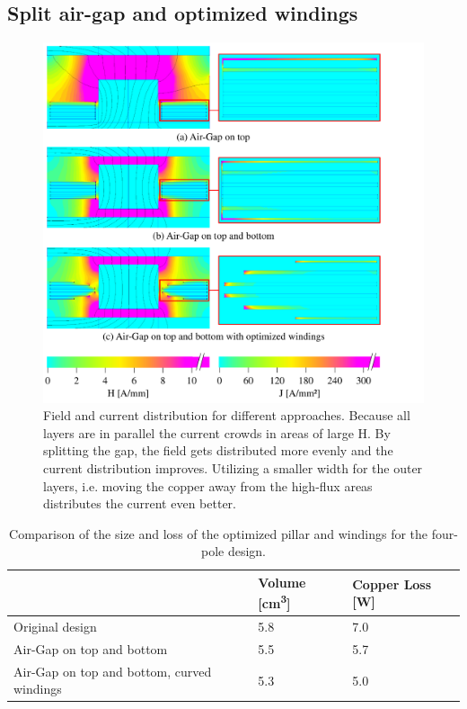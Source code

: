 \documentclass{IPEC2026}
\begin{document}
\subsection{Split air-gap and optimized windings}
\begin{figure}
  \includegraphics[page=1, trim = 0cm 0cm 3cm 0cm, clip, width=\columnwidth]{figures/IPEC_Figure_AirGap.pdf}
  \caption{Field and current distribution for different approaches. Because all layers are in parallel the current crowds in areas of large H. By splitting the gap, the field gets distributed more evenly and the current distribution improves. Utilizing a smaller width for the outer layers, i.e. moving the copper away from the high-flux areas distributes the current even better.}
  \label{fig:OptimizedGap}
\end{figure}

\begin{table}
  \centering
  \caption{Comparison of the size and loss of the optimized pillar and windings for the four-pole design.}
    \begin{tabular}{|p{}|p{}|p{}|}
    \hline  
      & {Volume [\unit{\cubic\cm}]} & {Copper Loss [\unit{\W}]} \\
    \hline
    \hline
    Original design & 5.8 & 7.0 \\
    \hline
    Air-Gap on top and bottom & 5.5 & 5.7 \\
    \hline
    Air-Gap on top and bottom, curved windings & 5.3 & 5.0 \\
    \hline
    \end{tabular}%
  \label{tab:OptimizationPQ}%
\end{table}%
\end{document}
